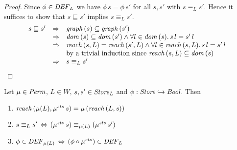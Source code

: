 \documentclass[12pt,a4paper]{report}
\newcommand{\ssto}{\nstyle{sto}}
\newcommand{\DEF}{\nstyle{DEF}}
\begin{document}
\begin{proof}
  Since $\phi \in \DEF_L$ we have $\phi\,s = \phi\,s'$ for all $s,s'$ with $s \equiv_L s'$. Hence
  it suffices to show that $s \sqsubseteq s'$ implies $s \equiv_L s'$.
  \[\begin{array}{rcl}
    s \sqsubseteq s'
    &\Rightarrow& \mathit{graph}\,(s) \subseteq \mathit{graph}\,(s') \\
    &\Rightarrow& \mathit{dom}\,(s) \subseteq \mathit{dom}\,(s') \wedge \forall l\in\mathit{dom}\,(s).\,s\,l = s'\,l \\
    &\Rightarrow& \mathit{reach}\,(s,L) = \mathit{reach}\,(s',L) \wedge \forall l\in\mathit{reach}\,(s,L).\,s\,l = s'\,l \\
    &           & \text{by a trivial induction since $\mathit{reach}\,(s,L) \subseteq \mathit{dom}\,(s)$} \\
    &\Rightarrow& s \equiv_L s'
  \end{array}\]
\end{proof}

\begin{lemma} \label{lemma:Permutations_and_Reachability}
  Let $\mu \in \mathit{Perm}$, $L \in W$, $s,s'\in\mathit{Store}_L$ and $\phi:\mathit{Store}\hookrightarrow\mathit{Bool}$.
  Then
  \begin{enumerate}
    \item $\reach{\mu(L)}{\mu^\ssto\,s} = \mu\,(\reach{L}{s})$
    \item $s \equiv_L s' \,\Leftrightarrow\, (\mu^\ssto\,s) \equiv_{\mu(L)} (\mu^\ssto\,s')$
    \item $\phi \in \DEF_{\mu(L)} \,\Leftrightarrow\, (\phi \circ \mu^\ssto) \in \DEF_L$
  \end{enumerate}
\end{lemma}
\end{document}
